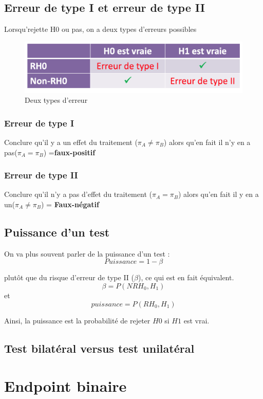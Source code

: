 \subsection{Erreur de type I et erreur de type II}
Lorsqu'rejette H0 ou pas, on a deux types d'erreurs possibles 
\begin{figure}[H]
    \centering
    \includegraphics[scale =0.5]{images/errors.png}
    \caption{Deux types d'erreur}
    \label{fig:type_error}
\end{figure}

\subsubsection{Erreur de type I}
Conclure qu’il y a un effet du traitement ($\pi_{A} \neq \pi_{B}$) alors qu’en fait il n’y en a pas($\pi_{A} = \pi_{B}$) =\textbf{faux-positif}

\subsubsection{Erreur de type II}
Conclure qu’il n’y a pas d’effet du traitement ($\pi_{A} = \pi_{B}$) alors qu’en fait il y en a un($\pi_{A} \neq \pi_{B}$) = \textbf{Faux-négatif}

\subsection{Puissance d'un test}
On va plus souvent parler de la puissance d’un test : 
$$Puissance = 1 - \beta$$

plutôt que du risque d’erreur de type II ($\beta$), ce qui est en fait équivalent.\\
$$\beta = P(NRH_{0},H_{1})$$ et $$puissance = P(RH_{0},H_{1})$$

Ainsi, la puissance est la probabilité de rejeter $H0$ si $H1$ est vrai.

\subsection{Test bilatéral versus test unilatéral}

\section{Endpoint binaire}

